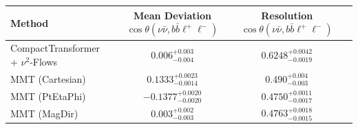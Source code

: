     \begin{tabular}{lccc}
        \toprule
        Method & Mean Deviation $\cos\theta(\nu\bar{\nu}, b\bar{b}\ell^+\ell^-)$ & Resolution $\cos\theta(\nu\bar{\nu}, b\bar{b}\ell^+\ell^-)$ \\
        \midrule
        CompactTransformer + $\nu^2$-Flows & $0.006^{+0.003}_{-0.004}$ & $0.6248^{+0.0042}_{-0.0019}$ \\
        MMT (Cartesian) & $0.1333^{+0.0023}_{-0.0014}$ & $0.490^{+0.004}_{-0.003}$ \\
        MMT (PtEtaPhi) & $-0.1377^{+0.0020}_{-0.0020}$ & $0.4750^{+0.0011}_{-0.0017}$ \\
        MMT (MagDir) & $0.003^{+0.002}_{-0.003}$ & $0.4763^{+0.0018}_{-0.0015}$ \\
        \bottomrule
    \end{tabular}